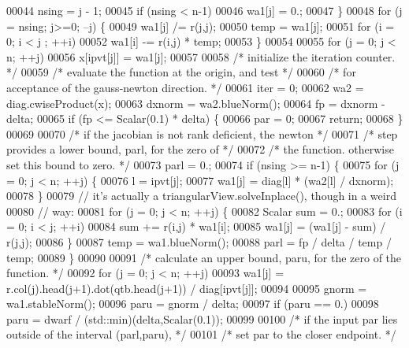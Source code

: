 \begin{DoxyCode}
00044             nsing = j - 1;
00045         \textcolor{keywordflow}{if} (nsing < n-1)
00046             wa1[j] = 0.;
00047     \}
00048     \textcolor{keywordflow}{for} (j = nsing; j>=0; --j) \{
00049         wa1[j] /= r(j,j);
00050         temp = wa1[j];
00051         \textcolor{keywordflow}{for} (i = 0; i < j ; ++i)
00052             wa1[i] -= r(i,j) * temp;
00053     \}
00054 
00055     \textcolor{keywordflow}{for} (j = 0; j < n; ++j)
00056         x[ipvt[j]] = wa1[j];
00057 
00058     \textcolor{comment}{/* initialize the iteration counter. */}
00059     \textcolor{comment}{/* evaluate the function at the origin, and test */}
00060     \textcolor{comment}{/* for acceptance of the gauss-newton direction. */}
00061     iter = 0;
00062     wa2 = diag.cwiseProduct(x);
00063     dxnorm = wa2.blueNorm();
00064     fp = dxnorm - delta;
00065     \textcolor{keywordflow}{if} (fp <= Scalar(0.1) * delta) \{
00066         par = 0;
00067         \textcolor{keywordflow}{return};
00068     \}
00069 
00070     \textcolor{comment}{/* if the jacobian is not rank deficient, the newton */}
00071     \textcolor{comment}{/* step provides a lower bound, parl, for the zero of */}
00072     \textcolor{comment}{/* the function. otherwise set this bound to zero. */}
00073     parl = 0.;
00074     \textcolor{keywordflow}{if} (nsing >= n-1) \{
00075         \textcolor{keywordflow}{for} (j = 0; j < n; ++j) \{
00076             l = ipvt[j];
00077             wa1[j] = diag[l] * (wa2[l] / dxnorm);
00078         \}
00079         \textcolor{comment}{// it's actually a triangularView.solveInplace(), though in a weird}
00080         \textcolor{comment}{// way:}
00081         \textcolor{keywordflow}{for} (j = 0; j < n; ++j) \{
00082             Scalar sum = 0.;
00083             \textcolor{keywordflow}{for} (i = 0; i < j; ++i)
00084                 sum += r(i,j) * wa1[i];
00085             wa1[j] = (wa1[j] - sum) / r(j,j);
00086         \}
00087         temp = wa1.blueNorm();
00088         parl = fp / delta / temp / temp;
00089     \}
00090 
00091     \textcolor{comment}{/* calculate an upper bound, paru, for the zero of the function. */}
00092     \textcolor{keywordflow}{for} (j = 0; j < n; ++j)
00093         wa1[j] = r.col(j).head(j+1).dot(qtb.head(j+1)) / diag[ipvt[j]];
00094 
00095     gnorm = wa1.stableNorm();
00096     paru = gnorm / delta;
00097     \textcolor{keywordflow}{if} (paru == 0.)
00098         paru = dwarf / (std::min)(delta,Scalar(0.1));
00099 
00100     \textcolor{comment}{/* if the input par lies outside of the interval (parl,paru), */}
00101     \textcolor{comment}{/* set par to the closer endpoint. */}

\end{DoxyCode}
